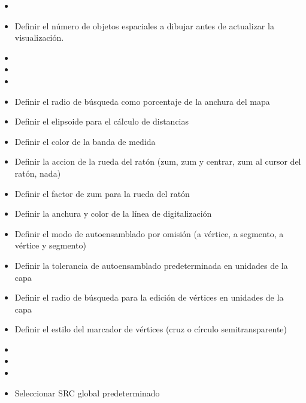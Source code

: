 
\begin{itemize}
\item {}
\item Definir el número de objetos espaciales a dibujar antes de actualizar la visualización.
\item {}
\item {}
\item {} 
\end{itemize}


\begin{itemize}
\item Definir el radio de búsqueda como porcentaje de la anchura del mapa
\item Definir el elipsoide para el cálculo de distancias
\item Definir el color de la banda de medida
\item Definir la accion de la rueda del ratón (zum, zum y centrar, zum al cursor del
ratón, nada)
\item Definir el factor de zum para la rueda del ratón
\end{itemize}


\begin{itemize}
\item Definir la anchura y color de la línea de digitalización
\item Definir el modo de autoensamblado por omisión (a vértice, a segmento, a vértice y
segmento)
\item Definir la tolerancia de autoensamblado predeterminada en unidades de la capa
\item Definir el radio de búsqueda para la edición de vértices en unidades de la capa
\item Definir el estilo del marcador de vértices (cruz o círculo semitransparente)
\end{itemize}


\begin{itemize}
\item {}
\item {}
\item {}
\item Seleccionar SRC global predeterminado
\end{itemize}

